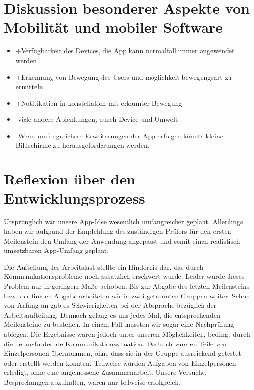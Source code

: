 \documentclass{article}
\begin{document}
    
\section{Diskussion besonderer Aspekte von Mobilität und
mobiler Software}
\begin{itemize}
\item +Verfügbarkeit des Devices, die App kann normalfall immer angewendet werden
\item +Erkennung von Bewegung des Users und möglichkeit bewegungsart zu ermitteln
\item +Notitikation in konstellation mit erkannter Bewegung
\item -viele andere Ablenkungen, durch Device und Umwelt
\item -Wenn umfangreichere Erweiterungen der App erfolgen könnte kleine Bildschirme zu herausgeforderungen werden.
\end{itemize}
    
   

\section{Reflexion über den Entwicklungsprozess}

    Ursprünglich war unsere App-Idee wesentlich umfangreicher geplant. Allerdings haben wir aufgrund der Empfehlung des zuständigen Prüfers für den ersten Meilenstein den Umfang der Anwendung angepasst und somit einen realistisch umsetzbaren App-Umfang geplant.

	
		Die Aufteilung der Arbeitslast stellte ein Hindernis dar, das durch Kommunikationsprobleme noch zusätzlich erschwert wurde. Leider wurde dieses Problem nur in geringem Maße behoben. Bis zur Abgabe des letzten Meilensteins bzw. der finalen Abgabe arbeiteten wir in zwei getrennten Gruppen weiter. Schon von Anfang an gab es Schwierigkeiten bei der Absprache bezüglich der Arbeitsaufteilung. Dennoch gelang es uns jedes Mal, die entsprechenden Meilensteine zu bestehen. In einem Fall mussten wir sogar eine Nachprüfung ablegen. Die Ergebnisse waren jedoch unter unseren Möglichkeiten, bedingt durch die herausfordernde Kommunikationssituation. Dadurch wurden Teile von Einzelpersonen übernommen, ohne dass sie in der Gruppe ausreichend getestet oder erstellt werden konnten. Teilweise wurden Aufgaben von Einzelpersonen erledigt, ohne eine angemessene Zusammenarbeit. Unsere Versuche, Besprechungen abzuhalten, waren nur teilweise erfolgreich.
		
\end{document}
